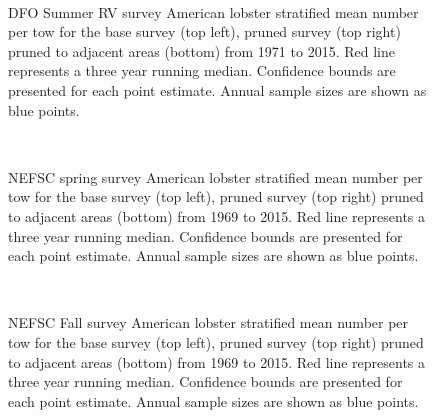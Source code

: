 \documentclass[11pt]{article}
\newcommand{\e}{/backup/bio_data/bio.lobster/figures/} %
\begin{document}
\begin{figure}
\centering
{}\\

\caption{DFO Summer RV survey American lobster stratified mean number per tow for the base survey (top left), pruned survey (top right) pruned to adjacent areas (bottom) from 1971 to 2015. Red line represents a three year running median. Confidence bounds are presented for each point estimate. Annual sample sizes are shown as blue points. }
\end{figure}
\clearpage

\begin{figure}
\centering
{}\\

\caption{NEFSC spring survey American lobster stratified mean number per tow for the base survey (top left), pruned survey (top right) pruned to adjacent areas (bottom) from 1969 to 2015. Red line represents a three year running median. Confidence bounds are presented for each point estimate. Annual sample sizes are shown as blue points. }
\end{figure}
\clearpage


\begin{figure}
\centering
{}\\

\caption{NEFSC Fall survey American lobster stratified mean number per tow for the base survey (top left), pruned survey (top right) pruned to adjacent areas (bottom) from 1969 to 2015. Red line represents a three year running median. Confidence bounds are presented for each point estimate. Annual sample sizes are shown as blue points. }
\end{figure}
\clearpage
\end{document}
